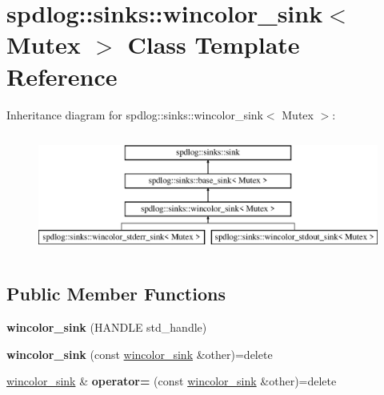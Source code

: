 \hypertarget{classspdlog_1_1sinks_1_1wincolor__sink}{}\section{spdlog\+:\+:sinks\+:\+:wincolor\+\_\+sink$<$ Mutex $>$ Class Template Reference}
\label{classspdlog_1_1sinks_1_1wincolor__sink}
Inheritance diagram for spdlog\+:\+:sinks\+:\+:wincolor\+\_\+sink$<$ Mutex $>$\+:\begin{figure}[H]
\begin{center}
\leavevmode
\includegraphics[height=4.000000cm]{classspdlog_1_1sinks_1_1wincolor__sink}
\end{center}
\end{figure}
\subsection*{Public Member Functions}
\begin{DoxyCompactItemize}
\item 
{\bfseries wincolor\+\_\+sink} (H\+A\+N\+D\+LE std\+\_\+handle)\hypertarget{classspdlog_1_1sinks_1_1wincolor__sink_abea9e884595558609bbadcf4767f7e7c}{}\label{classspdlog_1_1sinks_1_1wincolor__sink_abea9e884595558609bbadcf4767f7e7c}

\item 
{\bfseries wincolor\+\_\+sink} (const \hyperlink{classspdlog_1_1sinks_1_1wincolor__sink}{wincolor\+\_\+sink} \&other)=delete\hypertarget{classspdlog_1_1sinks_1_1wincolor__sink_a4619672e7a223b4e6c089d4b4606bb99}{}\label{classspdlog_1_1sinks_1_1wincolor__sink_a4619672e7a223b4e6c089d4b4606bb99}

\item 
\hyperlink{classspdlog_1_1sinks_1_1wincolor__sink}{wincolor\+\_\+sink} \& {\bfseries operator=} (const \hyperlink{classspdlog_1_1sinks_1_1wincolor__sink}{wincolor\+\_\+sink} \&other)=delete\hypertarget{classspdlog_1_1sinks_1_1wincolor__sink_ad1c72d9c4e1dd6f28bb4a8f2b915e04a}{}\label{classspdlog_1_1sinks_1_1wincolor__sink_ad1c72d9c4e1dd6f28bb4a8f2b915e04a}

\end{DoxyCompactItemize}
